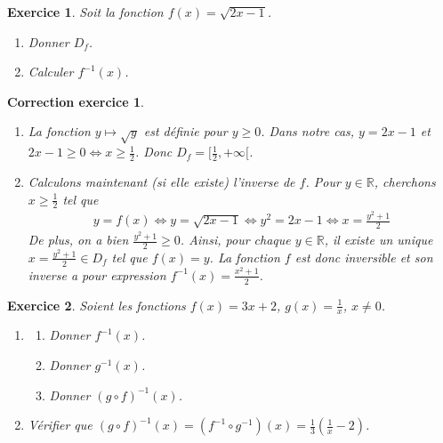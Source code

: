 \documentclass[12pt]{article}
\newtheorem{exercice}{\bf Exercice}
\newtheorem{correction}{\bf Correction exercice}
\newenvironment{exo}{
  \begin{exercice}\normalfont}{\end{exercice}
}
\newenvironment{cor}{
\begin{correction}\smallskip\normalfont}{\end{correction}
}
\newcommand*{\R}{\mathbb{R}}
\newif\ifcorrige\corrigetrue
\begin{document}


\begin{exo} Soit la fonction $f(x) = \sqrt{2x-1}$.
\begin{multicols}{2}
\begin{enumerate}
\item Donner $D_f$.
\item Calculer $f^{-1}(x)$.
\end{enumerate}
\end{multicols}
\end{exo}

\ifcorrige
\color{magenta}
\begin{cor}
  $\qquad$
\begin{enumerate}
\item La fonction $y \mapsto \sqrt{y}$ est d\'efinie pour $y \geq 0$.
  Dans notre cas, $y = 2x-1$ et $2x-1 \geq 0 \iff x \geq \frac12$.
  Donc $D_f = [ \frac12 , + \infty [$.
\item Calculons maintenant (si elle existe) l'inverse de $f$.
  Pour $y \in \R$, cherchons $x \geq \frac12$ tel que
  \begin{align*}
    y = f(x)
    \iff
    y = \sqrt{2x-1}
    \iff
    y^2 = 2x-1
    \iff
    x = \frac{y^2+1}{2}
  \end{align*}
  De plus, on a bien $\frac{y^2+1}{2} \geq 0$.
  Ainsi, pour chaque $y \in \R$, il existe un unique $x = \frac{y^2+1}{2} \in D_f$ tel que $f(x) = y$.
  La fonction $f$ est donc inversible et son inverse a pour expression $f^{-1}(x) = \frac{x^2+1}{2}$.
\end{enumerate}
\end{cor}
\color{black}
\fi


\begin{exo} Soient les fonctions $f(x) = 3x+2$, $g(x) = \frac1x$, $x \neq 0$.
\begin{enumerate}
\item 
\begin{multicols}{3}
\begin{enumerate}
\item Donner $f^{-1}(x)$.
\item Donner $g^{-1}(x)$.
\item Donner $(g \circ f)^{-1}(x)$.
\end{enumerate}
\end{multicols}
\item V\'erifier que $(g \circ f)^{-1}(x) = (f^{-1} \circ g^{-1})(x) = \frac13 (\frac1x - 2)$.
\end{enumerate}
\end{exo}
\end{document}
